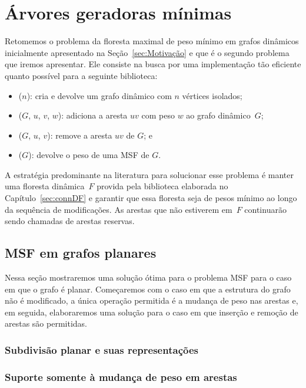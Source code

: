 \chapter{Árvores geradoras mínimas}
\label{sec:MSF}


Retomemos o problema da floresta maximal de peso mínimo em grafos dinâmicos inicialmente apresentado na Seção~\ref{sec:Motivação} e que é o segundo problema que iremos apresentar. Ele consiste na busca por uma implementação tão eficiente quanto possível para a seguinte biblioteca:

\begin{itemize}
\item \MSFCreate($n$): cria e devolve um grafo dinâmico com $n$ vértices isolados;
\item \MSFaddEdge($G$, $u$, $v$, $w$): adiciona a aresta $uv$ com peso $w$ ao grafo dinâmico~$G$;
\item \MSFdelEdge($G$, $u$, $v$): remove a aresta $uv$ de $G$; e
\item \MSFweight($G$): devolve o peso de uma MSF de $G$.
\end{itemize}


A estratégia predominante na literatura para solucionar esse problema é manter uma floresta dinâmica~$F$ provida pela biblioteca
elaborada no Capítulo~\ref{sec:connDF} e garantir que essa floresta seja de pesos mínimo ao longo da
sequência de modificações. As arestas que não estiverem em~$F$ continuarão sendo chamadas de arestas
reservas.

\section{MSF em grafos planares}

Nessa seção mostraremos uma solução ótima para o problema MSF para o caso em que o grafo é planar.
Começaremos com o caso em que a estrutura do grafo não é modificado, a única operação permitida é a
mudança de peso nas arestas e, em seguida, elaboraremos uma solução para o caso em que inserção e
remoção de arestas são permitidas.

\subsection{Subdivisão planar e suas representações}

\subsection{Suporte somente à mudança de peso em arestas}


